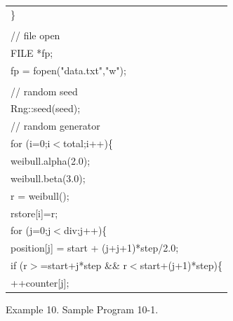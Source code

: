 {\begin{center}
\begin{tabular}{|l|}
\hspace*{10mm}\}\\
\\
\hspace*{10mm}// file open\\
\hspace*{10mm}FILE *fp;\\
\hspace*{10mm}fp = fopen("data.txt","w");\\
\\
\hspace*{10mm}// random seed\\
\hspace*{10mm}Rng::seed(seed);\\
\hspace*{10mm}// random generator\\
\hspace*{10mm}for (i=0;i$<$total;i++)\{\\
\hspace*{20mm}weibull.alpha(2.0);\\
\hspace*{20mm}weibull.beta(3.0);\\
\hspace*{20mm}r = weibull();\\
\hspace*{20mm}rstore[i]=r;\\
\hspace*{20mm}for (j=0;j$<$div;j++)\{\\
\hspace*{30mm}position[j] = start + (j+j+1)*step/2.0;\\
\hspace*{30mm}if (r$>$=start+j*step \&\& r$<$start+(j+1)*step)\{\\
\hspace*{40mm}++counter[j];\\\hline
\end{tabular}
\vspace*{5mm}

{\small
Example 10. Sample Program 10-1.
}
\end{center}
}  

\clearpage

